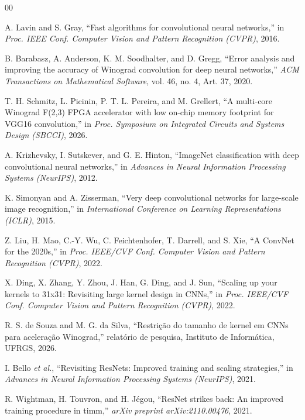 \documentclass[conference]{IEEEtran}
\begin{document}
\renewcommand{\refname}{Referências}
\begin{thebibliography}{00}

A. Lavin and S. Gray, ``Fast algorithms for convolutional neural networks,'' in \textit{Proc. IEEE Conf. Computer Vision and Pattern Recognition (CVPR)}, 2016.

B. Barabasz, A. Anderson, K. M. Soodhalter, and D. Gregg, ``Error analysis and improving the accuracy of Winograd convolution for deep neural networks,'' \textit{ACM Transactions on Mathematical Software}, vol. 46, no. 4, Art. 37, 2020.

T. H. Schmitz, L. Picinin, P. T. L. Pereira, and M. Grellert, ``A multi-core Winograd F(2,3) FPGA accelerator with low on-chip memory footprint for VGG16 convolution,'' in \textit{Proc. Symposium on Integrated Circuits and Systems Design (SBCCI)}, 2026.

A. Krizhevsky, I. Sutskever, and G. E. Hinton, ``ImageNet classification with deep convolutional neural networks,'' in \textit{Advances in Neural Information Processing Systems (NeurIPS)}, 2012.

K. Simonyan and A. Zisserman, ``Very deep convolutional networks for large-scale image recognition,'' in \textit{International Conference on Learning Representations (ICLR)}, 2015.

Z. Liu, H. Mao, C.-Y. Wu, C. Feichtenhofer, T. Darrell, and S. Xie, ``A ConvNet for the 2020s,'' in \textit{Proc. IEEE/CVF Conf. Computer Vision and Pattern Recognition (CVPR)}, 2022.

X. Ding, X. Zhang, Y. Zhou, J. Han, G. Ding, and J. Sun, ``Scaling up your kernels to 31x31: Revisiting large kernel design in CNNs,'' in \textit{Proc. IEEE/CVF Conf. Computer Vision and Pattern Recognition (CVPR)}, 2022.

R. S. de Souza and M. G. da Silva, ``Restrição do tamanho de kernel em CNNs para aceleração Winograd,'' relatório de pesquisa, Instituto de Informática, UFRGS, 2026.

I. Bello \textit{et al.}, ``Revisiting ResNets: Improved training and scaling strategies,'' in \textit{Advances in Neural Information Processing Systems (NeurIPS)}, 2021.

R. Wightman, H. Touvron, and H. Jégou, ``ResNet strikes back: An improved training procedure in timm,'' \textit{arXiv preprint arXiv:2110.00476}, 2021.


\end{thebibliography}
\end{document}
